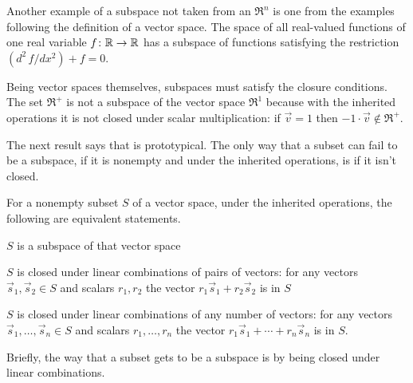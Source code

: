 \begin{example}
Another example of a subspace not taken from an $\Re^n$ is 
one from the examples following the definition of a vector space.
The space of all real-valued functions of one real variable 
$\mbox{$f\colon \mathbb{R}\to \mathbb{R}$}$ has a subspace of functions satisfying
the restriction $(d^2\,f/dx^2)+f=0$.
\end{example}

\begin{example}  \label{cex:RPlusNotSubSp}
Being vector spaces themselves, subspaces must satisfy the closure
conditions.
The set \( \Re^+ \) is not a subspace of the vector space \( \Re^1 \)
because with the inherited operations it is not closed under scalar
multiplication: if \( \vec{v}=1 \) then \( -1\cdot\vec{v}\not\in\Re^+ \).
\end{example}

The next result says that  is prototypical. 
The only way that a subset can fail to be a subspace, 
if it is nonempty and under the inherited operations,
is if it isn't closed.

\begin{lemma}     \label{th:SubspIffClosed} 
For a nonempty subset \( S \) of a vector space, under the inherited 
operations, the following are equivalent 
statements.   %
\begin{tfae}
  \item \( S \) is a subspace of that vector space
  \item \( S \) is closed under linear combinations of pairs of vectors:
    for any vectors \( \vec{s}_1,\vec{s}_2\in S \) and scalars \( r_1,r_2 \)
    the vector \( r_1\vec{s}_1+r_2\vec{s}_2 \) is in \( S \)
  \item \( S \) is closed under linear combinations of any number of vectors:
    for any vectors \( \vec{s}_1,\ldots,\vec{s}_n\in S \) and scalars
    \( r_1, \ldots,r_n \)
    the vector \( r_1\vec{s}_1+\cdots+r_n\vec{s}_n \) is in \( S \).
\end{tfae}
\end{lemma}
Briefly, the way that a subset gets to be a 
subspace is by being closed under linear combinations.

